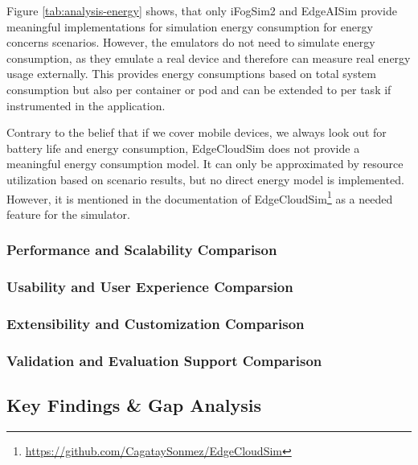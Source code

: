 Figure \ref{tab:analysis-energy} shows, that only iFogSim2 and EdgeAISim provide meaningful implementations for simulation energy consumption for energy concerns scenarios.
However, the emulators do not need to simulate energy consumption, as they emulate a real device and therefore can measure real energy usage externally.
This provides energy consumptions based on total system consumption but also per container or pod and can be extended to per task if instrumented in the application.

Contrary to the belief that if we cover mobile devices, we always look out for battery life and energy consumption, EdgeCloudSim does not provide a meaningful energy consumption model.
It can only be approximated by resource utilization based on scenario results, but no direct energy model is implemented.
However, it is mentioned in the documentation of EdgeCloudSim\footnote{\url{https://github.com/CagataySonmez/EdgeCloudSim}} as a needed feature for the simulator.

\subsubsection{Performance and Scalability Comparison}

\subsubsection{Usability and User Experience Comparsion}

\subsubsection{Extensibility and Customization Comparison}

\subsubsection{Validation and Evaluation Support Comparison}
\subsection{Key Findings \& Gap Analysis}
